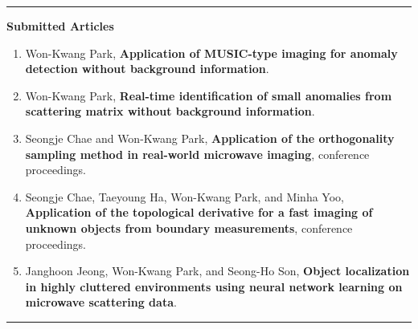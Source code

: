 \documentclass[10pt,A4]{article}
\newcommand{\cvsection}[1]
{
	\begin{center}
		\large\textcolor{sectcol}{\textbf{#1}}
	\end{center}
}
\begin{document}
\textcolor{softcol}{\hrule}

\cvsection{Submitted Articles}
\begin{enumerate}\renewcommand{\theenumi}{[S\arabic{enumi}]}
\renewcommand{\labelenumi}{\theenumi}
\item\label{A-CAMWA2023} Won-Kwang Park, \textbf{Application of MUSIC-type imaging for anomaly detection without background information}.
\item\label{A-IJAEM2023} Won-Kwang Park, \textbf{Real-time identification of small anomalies from scattering matrix without background information}.
\item\label{C-ICFICE2024} Seongje Chae and Won-Kwang Park, \textbf{Application of the orthogonality sampling method in real-world microwave imaging}, conference proceedings.
\item\label{C-IPMS2024} Seongje Chae, Taeyoung Ha, Won-Kwang Park, and Minha Yoo, \textbf{Application of the topological derivative for a fast imaging of unknown objects from boundary measurements}, conference proceedings.
\item\label{A-ELECTRONICS2023} Janghoon Jeong, Won-Kwang Park, and Seong-Ho Son, \textbf{Object localization in highly cluttered environments using neural network learning on microwave scattering data}.
\end{enumerate}

\textcolor{softcol}{\hrule}
\end{document}
